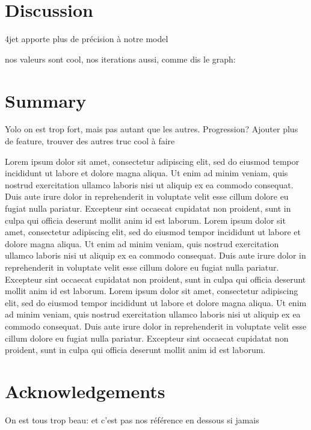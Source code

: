 \documentclass[10pt,conference,compsocconf]{IEEEtran}
\begin{document}
\section{Discussion}

4jet apporte plus de pr\'ecision \`a notre model

nos valeurs sont cool, nos iterations aussi, comme dis le graph:



\section{Summary}
	Yolo on est trop fort, mais pas autant que les autres.
	Progression? Ajouter plus de feature, trouver des autres truc cool \`a faire

Lorem ipsum dolor sit amet, consectetur adipiscing elit, sed do eiusmod tempor incididunt ut labore et dolore magna aliqua. Ut enim ad minim veniam, quis nostrud exercitation ullamco laboris nisi ut aliquip ex ea commodo consequat. Duis aute irure dolor in reprehenderit in voluptate velit esse cillum dolore eu fugiat nulla pariatur. Excepteur sint occaecat cupidatat non proident, sunt in culpa qui officia deserunt mollit anim id est laborum.
Lorem ipsum dolor sit amet, consectetur adipiscing elit, sed do eiusmod tempor incididunt ut labore et dolore magna aliqua. Ut enim ad minim veniam, quis nostrud exercitation ullamco laboris nisi ut aliquip ex ea commodo consequat. Duis aute irure dolor in reprehenderit in voluptate velit esse cillum dolore eu fugiat nulla pariatur. Excepteur sint occaecat cupidatat non proident, sunt in culpa qui officia deserunt mollit anim id est laborum.
Lorem ipsum dolor sit amet, consectetur adipiscing elit, sed do eiusmod tempor incididunt ut labore et dolore magna aliqua. Ut enim ad minim veniam, quis nostrud exercitation ullamco laboris nisi ut aliquip ex ea commodo consequat. Duis aute irure dolor in reprehenderit in voluptate velit esse cillum dolore eu fugiat nulla pariatur. Excepteur sint occaecat cupidatat non proident, sunt in culpa qui officia deserunt mollit anim id est laborum.
\section*{Acknowledgements}
On est tous trop beau: et c'est pas nos r\'ef\'erence en dessous si jamais



\end{document}
